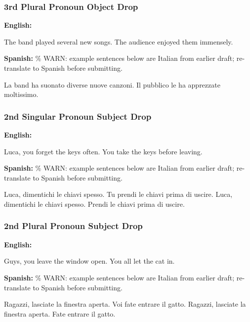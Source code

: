 \documentclass[12pt]{article}
\begin{document}
\subsubsection{3rd Plural Pronoun Object Drop}

\begin{exe}
    \ex \textbf{English:}
    \begin{xlist}
        \ex The band played several new songs. The audience enjoyed them immensely.
    \end{xlist}
    \ex \textbf{Spanish:} \% WARN: example sentences below are Italian from earlier draft; re-translate to Spanish before submitting.
    \begin{xlist}
        \ex La band ha suonato diverse nuove canzoni. Il pubblico le ha apprezzate moltissimo.
    \end{xlist}
\end{exe}

\subsubsection{2nd Singular Pronoun Subject Drop}

\begin{exe}
    \ex \textbf{English:}
    \begin{xlist}
        \ex Luca, you forget the keys often. You take the keys before leaving.
    \end{xlist}
    \ex \textbf{Spanish:} \% WARN: example sentences below are Italian from earlier draft; re-translate to Spanish before submitting.
    \begin{xlist}
        \ex Luca, dimentichi le chiavi spesso. Tu prendi le chiavi prima di uscire.
        \ex Luca, dimentichi le chiavi spesso. Prendi le chiavi prima di uscire.
    \end{xlist}
\end{exe}

\subsubsection{2nd Plural Pronoun Subject Drop}

\begin{exe}
    \ex \textbf{English:}
    \begin{xlist}
        \ex Guys, you leave the window open. You all let the cat in.
    \end{xlist}
    \ex \textbf{Spanish:} \% WARN: example sentences below are Italian from earlier draft; re-translate to Spanish before submitting.
    \begin{xlist}
        \ex Ragazzi, lasciate la finestra aperta. Voi fate entrare il gatto.
        \ex Ragazzi, lasciate la finestra aperta. Fate entrare il gatto.
    \end{xlist}
\end{exe}
\end{document}
